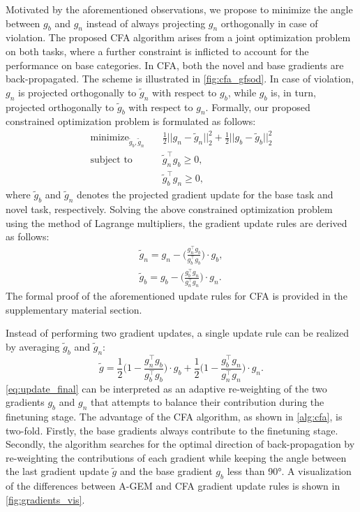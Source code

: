 \documentclass[10pt,twocolumn,letterpaper]{article}
\begin{document}
Motivated by the aforementioned observations, we propose to minimize the angle between $g_b$ and $g_n$ instead of always projecting $g_n$ orthogonally in case of violation. The proposed CFA algorithm arises from a joint optimization problem on both tasks, where a further constraint is inflicted to account for the performance on base categories. In CFA, both the novel and base gradients are back-propagated. The scheme is illustrated in \cref{fig:cfa_gfsod}. In case of violation, $g_n$ is projected orthogonally to $\tilde{g}_n$ with respect to $g_b$, while $g_b$ is, in turn, projected orthogonally to $\tilde{g}_b$ with respect to $g_n$.
Formally, our proposed constrained optimization problem is formulated as follows:
\begin{align}
	 	\textrm{minimize}_{\tilde{g}_b, \tilde{g}_n} \quad &\frac{1}{2}||g_n-\tilde{g}_n||_2^2 + \frac{1}{2}||g_b-\tilde{g}_b||_2^2 \nonumber\\
	 	\textrm{subject to} 				\quad &\tilde{g}_n^\top g_{b} \geq 0, \nonumber\\ 
	 	                                    \quad &\tilde{g}_b^\top g_{n} \geq 0,   \label{eq:qp_2}  
\end{align}
where $\tilde{g}_b$ and $\tilde{g}_n$ denotes the projected gradient update for the base task and novel task, respectively. Solving the above constrained optimization problem using the method of Lagrange multipliers, the gradient update rules are derived as follows: 
\begin{align}
        \tilde{g}_n =  g_{n} - \Big(\frac{g_{n}^\top g_{b}}{g_{b}^\top g_{b}} \Big) \cdot g_{b},\\
        \tilde{g}_b =  g_{b} - \Big(\frac{g_{b}^\top g_{n}}{g_{n}^\top g_{n}} \Big) \cdot g_{n}.
\end{align}
The formal proof of the aforementioned update rules for CFA is provided in the supplementary material section. 

Instead of performing two gradient updates, a single update rule can be realized by averaging $\tilde{g}_b$ and $\tilde{g}_n$:   
\begin{equation}
\label{eq:update_final}
    \tilde{g} =   \frac{1}{2} \Big(1 -  \frac{g_{n}^\top g_{b}}{g_{b}^\top g_{b}} \Big) \cdot g_{b} +  \frac{1}{2} \Big( 1 - \frac{g_{b}^\top g_{n}}{g_{n}^\top g_{n}} \Big) \cdot g_{n}.
\end{equation}
\cref{eq:update_final} can be interpreted as an adaptive re-weighting of the two gradients $g_b$ and $g_n$ that attempts to balance their contribution during the finetuning stage. The advantage of the CFA algorithm, as shown in \cref{alg:cfa}, is two-fold. Firstly, the base gradients always contribute to the finetuning stage. Secondly, the algorithm searches for the optimal direction of back-propagation by re-weighting the contributions of each gradient while keeping the angle between the last gradient update $\tilde{g}$ and the base gradient $g_b$ less than 90°. A visualization of the differences between A-GEM and CFA gradient update rules is shown in \cref{fig:gradients_vis}.  
\end{document}
